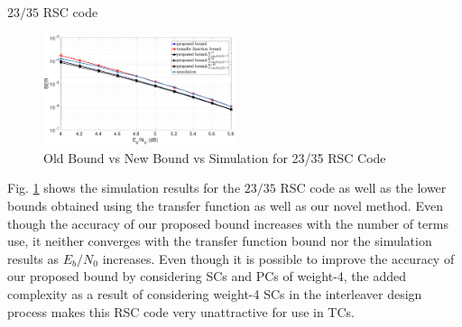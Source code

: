 \begin{example}{$23/35$ RSC code}
\begin{figure}[htbp]
	\centering
	\includegraphics[width=0.5\textwidth]{./Images/RSC_23_35_lower_weights2.eps}
	\caption{Old Bound vs New Bound vs Simulation for 23/35 RSC Code}
	\label{simFig3}
\end{figure}
Fig. \ref{simFig3} shows the simulation results for the $23/35$ RSC code as well as the lower bounds obtained using the transfer function as well as our novel method. Even though the accuracy of our proposed bound increases with the number of terms use, it neither converges with the transfer function bound nor the simulation results as $E_b/N_0$ increases. Even though it is possible to improve the accuracy of our proposed bound by considering SCs and PCs of weight-4, the added complexity as a result of considering weight-4 SCs in the interleaver design process makes this RSC code very unattractive for use in TCs. 
\end{example}





